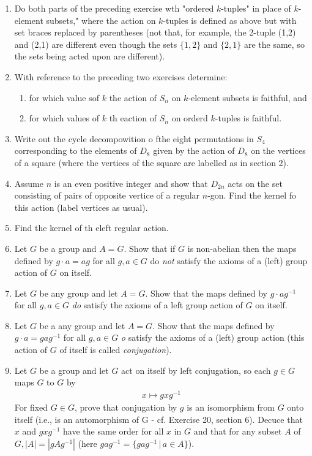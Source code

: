 \documentclass[10pt,a4paper]{report}
\begin{document}
\begin{enumerate}
	\item Do both parts of the preceding exercise wth "ordered $k$-tuples" in place of $k$-element subsets," where the action on $k$-tuples is defined as above but with set braces replaced by parentheses (not that, for example, the 2-tuple (1,2) and (2,1) are different even though the sets $\{1,2\}$ and $\{2,1\}$ are the same, so the sets being acted upon are different).
	
	\item With reference to the preceding two exercises determine:
	\begin{enumerate}
		\item for which value sof $k$ the action of $S_n$ on $k$-element subsets is faithful, and
		\item for which values of $k$ th eaction of $S_n$ on orderd $k$-tuples is faithful.
	\end{enumerate}
	
	\item Write out the cycle decompowition o fthe eight permutations in $S_4$ corresponding to the elements of $D_8$ given by the action of $D_8$ on the vertices of a square (where the vertices of the square are labelled as in section 2).
	
	\item Assume $n$ is an even positive integer and show that $D_{2n}$ acts on the set consisting of pairs of opposite vertice of a regular $n$-gon.  Find the kernel fo this action (label vertices as usual).
	
	\item Find the kernel of th eleft regular action.
	
	\item Let $G$ be a group and $A=G$.  Show that if $G$ is non-abelian then the maps defined by $g\cdot a=ag$ for all $g,a \in G$ do \textit{not} satisfy the axioms of a (left) group action of $G$ on itself.
	
	\item Let $G$ be any group and let $A=G$.  Show that the maps defined by $g\cdot ag^{-1}$ for all $g,a \in G$ \textit{do} satisfy the axioms of a left group action of $G$ on itself.
	
	\item Let $G$ be a any group and let $A = G$.  Show that the maps defined by $g\cdot a=gag^{-1}$ for all $g,a\in G$ \textit{o} satisfy the axioms of a (left) group action (this action of $G$ of itself is called \textit{conjugation}).
	
	\item Let $G$ be a group and let $G$ act on itself by left conjugation, so each $g \in G$ maps $G$ to $G$ by
	\begin{align*}
		x \mapsto gxg^{-1}
	\end{align*}For fixed $G\in G$, prove that conjugation by $g$ is an isomorphism from $G$ onto itself (i.e., is an automorphism of G - cf. Exercise 20, section 6).  Decuce that $x$ and $gxg^{-1}$ have the same order for all $x$ in $G$ and that for any subset $A$ of $G, |A| = |gAg^{-1}|$ (here $gag^{-1} = \{gag^{-1}\,|\, a \in A\}$).
	

\end{enumerate}
\end{document}

